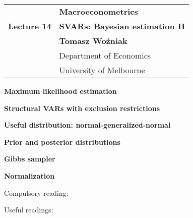 \documentclass[notes,blackandwhite,mathsans,usenames,dvipsnames]{beamer}
\begin{document}






{
\begin{frame}

\vspace{1cm}
\begin{tabular}{rl}
&\textbf{\LARGE\color{mcxs3} Macroeconometrics}\\[8ex]
\textbf{\Large Lecture 14}&\textbf{\Large\color{mcxs5}SVARs: Bayesian estimation II}\\[19ex]
&\textbf{Tomasz Wo\'zniak}\\[1ex]
&{\small\color{mcxs5} Department of Economics}\\
&{\small\color{mcxs5}University of Melbourne}
\end{tabular}

\end{frame}
}






{
\begin{frame}

\vspace{1cm}\textbf{\color{mcxs1}Maximum likelihood estimation}

\bigskip\textbf{\color{purple}Structural VARs with exclusion restrictions}

\smallskip\hspace{0.8cm}\textbf{\color{mcxs1}Useful distribution: normal-generalized-normal}

\bigskip\textbf{\color{mcxs1}Prior and posterior distributions}

\bigskip\textbf{\color{mcxs1}Gibbs sampler}

\bigskip\textbf{\color{mcxs1}Normalization}

\small\vspace{0.8cm} Compulsory reading: \scriptsize



\bigskip Useful readings: \scriptsize



\end{frame}
}
\end{document}
